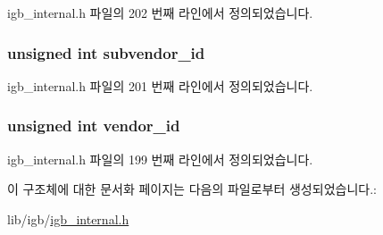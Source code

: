 igb\+\_\+internal.\+h 파일의 202 번째 라인에서 정의되었습니다.

\subsubsection[{\texorpdfstring{subvendor\+\_\+id}{subvendor_id}}]{\setlength{\rightskip}{0pt plus 5cm}unsigned int subvendor\+\_\+id}\hypertarget{struct__igb__vendor__info__t_a6858d2c34fb8ee4d1070bbabb24f582d}{}\label{struct__igb__vendor__info__t_a6858d2c34fb8ee4d1070bbabb24f582d}


igb\+\_\+internal.\+h 파일의 201 번째 라인에서 정의되었습니다.

\subsubsection[{\texorpdfstring{vendor\+\_\+id}{vendor_id}}]{\setlength{\rightskip}{0pt plus 5cm}unsigned int vendor\+\_\+id}\hypertarget{struct__igb__vendor__info__t_a39273a5704a715a766f66c08e9b2437c}{}\label{struct__igb__vendor__info__t_a39273a5704a715a766f66c08e9b2437c}


igb\+\_\+internal.\+h 파일의 199 번째 라인에서 정의되었습니다.



이 구조체에 대한 문서화 페이지는 다음의 파일로부터 생성되었습니다.\+:\begin{DoxyCompactItemize}
\item 
lib/igb/\hyperlink{igb__internal_8h}{igb\+\_\+internal.\+h}\end{DoxyCompactItemize}
